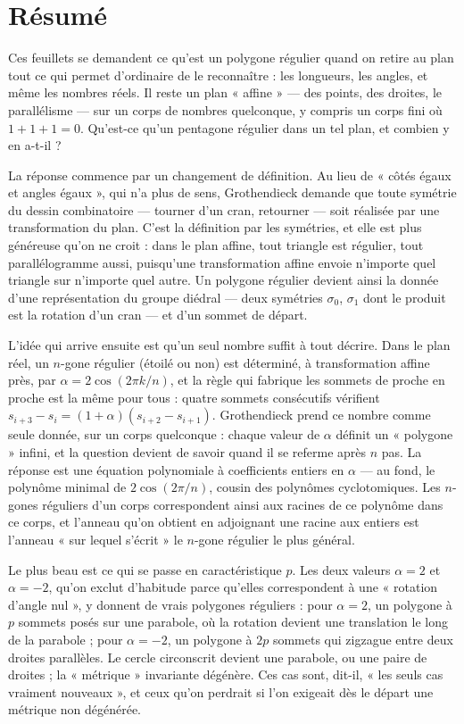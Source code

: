 \documentclass[11pt,a4paper]{article}
\begin{document}
\section*{Résumé}

\begin{resume}
Ces feuillets se demandent ce qu'est un polygone régulier quand on retire au
plan tout ce qui permet d'ordinaire de le reconnaître : les longueurs, les
angles, et même les nombres réels. Il reste un plan « affine » --- des points,
des droites, le parallélisme --- sur un corps de nombres quelconque, y compris
un corps fini où $1 + 1 + 1 = 0$. Qu'est-ce qu'un pentagone régulier dans un
tel plan, et combien y en a-t-il ?

La réponse commence par un changement de définition. Au lieu de « côtés égaux
et angles égaux », qui n'a plus de sens, Grothendieck demande que toute
symétrie du dessin combinatoire --- tourner d'un cran, retourner --- soit
réalisée par une transformation du plan. C'est la définition par les
symétries, et elle est plus généreuse qu'on ne croit : dans le plan affine,
tout triangle est régulier, tout parallélogramme aussi, puisqu'une
transformation affine envoie n'importe quel triangle sur n'importe quel autre.
Un polygone régulier devient ainsi la donnée d'une représentation du groupe
diédral --- deux symétries $\sigma_0$, $\sigma_1$ dont le produit est la
rotation d'un cran --- et d'un sommet de départ.

L'idée qui arrive ensuite est qu'un seul nombre suffit à tout décrire. Dans le
plan réel, un $n$-gone régulier (étoilé ou non) est déterminé, à transformation
affine près, par $\alpha = 2\cos(2\pi k/n)$, et la règle qui fabrique les
sommets de proche en proche est la même pour tous : quatre sommets consécutifs
vérifient $s_{i+3} - s_i = (1 + \alpha)(s_{i+2} - s_{i+1})$. Grothendieck prend
ce nombre comme seule donnée, sur un corps quelconque : chaque valeur de
$\alpha$ définit un « polygone » infini, et la question devient de savoir
quand il se referme après $n$ pas. La réponse est une équation polynomiale à
coefficients entiers en $\alpha$ --- au fond, le polynôme minimal de
$2\cos(2\pi/n)$, cousin des polynômes cyclotomiques. Les $n$-gones réguliers
d'un corps correspondent ainsi aux racines de ce polynôme dans ce corps, et
l'anneau qu'on obtient en adjoignant une racine aux entiers est l'anneau « sur
lequel s'écrit » le $n$-gone régulier le plus général.

Le plus beau est ce qui se passe en caractéristique $p$. Les deux valeurs
$\alpha = 2$ et $\alpha = -2$, qu'on exclut d'habitude parce qu'elles
correspondent à une « rotation d'angle nul », y donnent de vrais polygones
réguliers : pour $\alpha = 2$, un polygone à $p$ sommets posés sur une
parabole, où la rotation devient une translation le long de la parabole ; pour
$\alpha = -2$, un polygone à $2p$ sommets qui zigzague entre deux droites
parallèles. Le cercle circonscrit devient une parabole, ou une paire de
droites ; la « métrique » invariante dégénère. Ces cas sont, dit-il, « les
seuls cas vraiment nouveaux », et ceux qu'on perdrait si l'on exigeait dès le
départ une métrique non dégénérée.


\end{resume}
\end{document}
